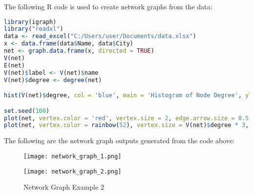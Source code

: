 \documentclass{article}
\begin{document}
The following R code is used to create network graphs from the data:

\begin{lstlisting}[language=R]
library(igraph)
library("readxl")
data <- read_excel("C:/Users/user/Documents/data.xlsx")
x <- data.frame(data$Name, data$City)
net <- graph.data.frame(x, directed = TRUE)
V(net)
E(net)
V(net)$label <- V(net)$name
V(net)$degree <- degree(net)

hist(V(net)$degree, col = 'blue', main = 'Histogram of Node Degree', ylab = 'Frequency', xlab = 'Degree of Vertices')

set.seed(100)
plot(net, vertex.color = 'red', vertex.size = 2, edge.arrow.size = 0.5, vertex.label.cex = 0.8)
plot(net, vertex.color = rainbow(52), vertex.size = V(net)$degree * 3, edge.arrow.size = 1, layout = layout.fruchterman.reingold)
\end{lstlisting}

The following are the network graph outputs generated from the code above:

\begin{figure}[h!]
  \centering
  \begin{minipage}{0.45\textwidth}
    \centering
    \texttt{[image: network\_graph\_1.png]} %
    \caption{Network Graph Example 1}
    \label{fig:networkgraph_1}
  \end{minipage} \hfill
  \begin{minipage}{0.45\textwidth}
    \centering
    \texttt{[image: network\_graph\_2.png]} %
    \caption{Network Graph Example 2}
    \label{fig:networkgraph_2}
  \end{minipage}
\end{figure}
\end{document}
